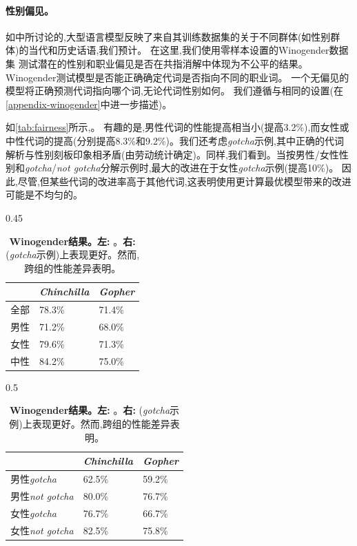 \documentclass[11pt, a4paper, logo, copyright, nonumbering]{deepmind}
\newcommand{\gopher}{\textit{Gopher}\xspace}
\newcommand{\chinchilla}{\textit{Chinchilla}\xspace}
\begin{document}
\paragraph{性别偏见。}
如\citet{rae2021gopher}中所讨论的,大型语言模型反映了来自其训练数据集的关于不同群体(如性别群体)的当代和历史话语,我们预计。
在这里,我们使用零样本设置的Winogender数据集 \citep{rudinger2018gender}测试潜在的性别和职业偏见是否在共指消解中体现为不公平的结果。
Winogender测试模型是否能正确确定代词是否指向不同的职业词。
一个无偏见的模型将正确预测代词指向哪个词,无论代词性别如何。
我们遵循与\citet{rae2021gopher}相同的设置(在\autoref{appendix-winogender}中进一步描述)。

如\autoref{tab:fairness}所示,。
有趣的是,男性代词的性能提高相当小(提高3.2\%),而女性或中性代词的提高(分别提高8.3\%和9.2\%)。我们还考虑\textit{gotcha}示例,其中正确的代词解析与性别刻板印象相矛盾(由劳动统计确定)。同样,我们看到。当按男性/女性性别和\textit{gotcha}/\textit{not gotcha}分解示例时,最大的改进在于女性\textit{gotcha}示例(提高10\%)。
因此,尽管,但某些代词的改进率高于其他代词,这表明使用更计算最优模型带来的改进可能是不均匀的。

\begin{table}[t]
    \begin{subtable}[h]{0.45\textwidth}
        \centering
        \begin{tabular}{l | l | l}
    \toprule
    & \chinchilla & \gopher \\
    \midrule
    全部 & 78.3\% & 71.4\% \\
    男性 & 71.2\% & 68.0\% \\
    女性 & 79.6\% & 71.3\% \\
    中性 & 84.2\% & 75.0\% \\
    \bottomrule
       \end{tabular}
       \label{tab:fairness1}
    \end{subtable}
    \hfill
    \begin{subtable}[h]{0.5\textwidth}
        \centering
        \begin{tabular}{l | l | l}
    \toprule
    & \chinchilla & \gopher \\
    \midrule
    男性\textit{gotcha} & 62.5\% & 59.2\% \\
    男性\textit{not gotcha} & 80.0\% & 76.7\% \\
    女性\textit{gotcha} & 76.7\% & 66.7\% \\
    女性\textit{not gotcha} & 82.5\% & 75.8\% \\ 
    \bottomrule
        \end{tabular}
        \label{tab:fairness2}
     \end{subtable}
     \caption{\textbf{Winogender结果。}\textbf{左:} 。\textbf{右:} (\textit{gotcha}示例)上表现更好。然而,跨组的性能差异表明。}
     \label{tab:fairness}
\end{table}
\end{document}

